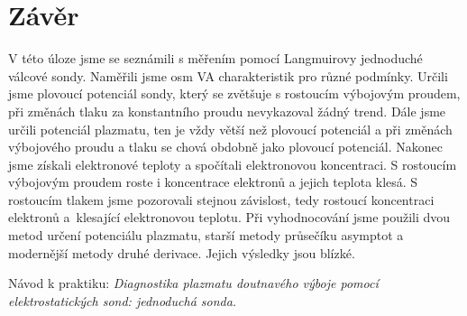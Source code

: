\documentclass[a4paper,12pt]{article}
\begin{document}
\section{Závěr}
V této úloze jsme se seznámili s měřením pomocí Langmuirovy jednoduché válcové sondy. Naměřili jsme osm VA charakteristik pro různé
podmínky. Určili jsme plovoucí potenciál sondy, který se zvětšuje s rostoucím výbojovým proudem, při změnách tlaku za konstantního
proudu nevykazoval žádný trend. Dále jsme určili potenciál plazmatu, ten je vždy větší než plovoucí potenciál a při změnách výbojového
proudu a tlaku se chová obdobně jako plovoucí potenciál. Nakonec jsme získali elektronové teploty a spočítali elektronovou koncentraci. S rostoucím výbojovým
proudem roste i koncentrace elektronů a jejich teplota klesá. S rostoucím tlakem jsme pozorovali stejnou závislost, tedy rostoucí
koncentraci elektronů a~klesající elektronovou teplotu. Při vyhodnocování jsme 
použili dvou metod určení potenciálu plazmatu, starší metody průsečíku asymptot 
a modernější metody druhé derivace. Jejich výsledky jsou blízké.

\begin{thebibliography}{10}
	 Návod k praktiku: \textit{Diagnostika plazmatu doutnavého výboje pomocí 
	elektrostatických sond: jednoduchá sonda.}

\end{thebibliography}
\end{document}
